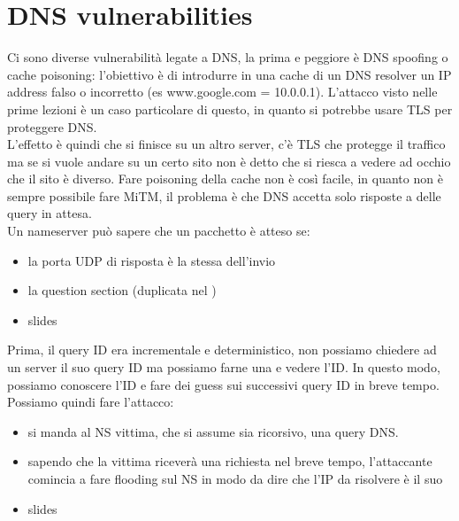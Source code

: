 \documentclass[12pt, oneside]{extbook} %
\begin{document}
\section{DNS vulnerabilities}
Ci sono diverse vulnerabilità legate a DNS, la prima e peggiore è DNS spoofing o cache poisoning: l'obiettivo è di introdurre in una cache di un DNS resolver un IP address falso o incorretto (es www.google.com = 10.0.0.1). L'attacco visto nelle prime lezioni è un caso particolare di questo, in quanto si potrebbe usare TLS per proteggere DNS.\\L'effetto è quindi che si finisce su un altro server, c'è TLS che protegge il traffico ma se si vuole andare su un certo sito non è detto che si riesca a vedere ad occhio che il sito è diverso. Fare poisoning della cache non è così facile, in quanto non è sempre possibile fare MiTM, il problema è che DNS accetta solo risposte a delle query in attesa.\\Un nameserver può sapere che un pacchetto è atteso se:
\begin{itemize}
	\item la porta UDP di risposta è la stessa dell'invio
	\item la question section (duplicata nel )
	\item slides
\end{itemize}
Prima, il query ID era incrementale e deterministico, non possiamo chiedere ad un server il suo query ID ma possiamo farne una e vedere l'ID. In questo modo, possiamo conoscere l'ID e fare dei guess sui successivi query ID in breve tempo.\\Possiamo quindi fare l'attacco:
\begin{itemize}
	\item si manda al NS vittima, che si assume sia ricorsivo, una query DNS.
	\item sapendo che la vittima riceverà una richiesta nel breve tempo, l'attaccante comincia a fare flooding sul NS in modo da dire che l'IP da risolvere è il suo
	\item slides
\end{itemize}
\end{document}
